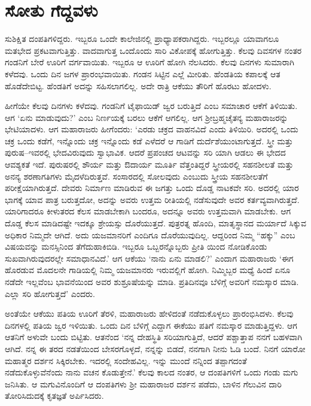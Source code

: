\section{ಸೋತು ಗೆದ್ದವಳು}

ಸುಶಿಕ್ಷಿತ ದಂಪತಿಗಳಿದ್ದರು. ಇಬ್ಬರೂ ಒಂದೇ ಕಾಲೇಜಿನಲ್ಲಿ ಪ್ರಾಧ್ಯಾಪಕರಾಗಿದ್ದರು. ಇಬ್ಬರಲ್ಲೂ ಯಾವಾಗಲೂ ಮತಭೇದ ಪ್ರಕಟವಾಗುತ್ತಿತ್ತು. ವಾದವಾಗುತ್ತ ಒಂದೊಂದು ಸಾರಿ ವಿಕೋಪಕ್ಕೆ ಹೋಗುತ್ತಿತ್ತು. ಕೆಲವು ದಿವಸಗಳ ನಂತರ ಗಂಡನಿಗೆ ಬೇರೆ ಊರಿಗೆ ವರ್ಗವಾಯಿತು. ಇಬ್ಬರೂ ಆ ಊರಿಗೆ ಹೋಗಿ ನೆಲಸಿದರು. ಕೆಲವು ದಿನಗಳು ಸುಮಾರಾಗಿ ಕಳೆದವು. ಒಂದು ದಿನ ಜಗಳ ಪ್ರಾರಂಭವಾಯಿತು. ಗಂಡನ ಸಿಟ್ಟಿನ ಎಲ್ಲೆ ಮೀರಿತು. ಹೆಂಡತಿಯ ಕಪಾಲಕ್ಕೆ ಆತ ಹೊಡೆದೇಬಿಟ್ಟ. ಹೆಂಡತಿಗೆ ಅದನ್ನು ಸಹಿಸಲಾಗಲಿಲ್ಲ. ಅದೇ ರಾತ್ರಿ ಆಕೆಯು ತೌರಿಗೆ ಹೊರಟು ಹೋದಳು.

ಹೀಗೆಯೇ ಕೆಲವು ದಿನಗಳು ಕಳೆದವು. ಗಂಡನಿಗೆ ಟೈಫಾಯಿಡ್ ಜ್ವರ ಬರುತ್ತಿದೆ ಎಂಬ ಸಮಾಚಾರ ಆಕೆಗೆ ತಿಳಿಯಿತು. ಆಗ ‘ಏನು ಮಾಡುವುದು?’ ಎಂಬ ನಿರ್ಣಯಕ್ಕೆ ಬರಲು ಆಕೆಗೆ ಆಗಲಿಲ್ಲ. ಆಗ ಶ‍್ರೀಬ್ರಹ್ಮಚೈತನ್ಯ ಮಹಾರಾಜರನ್ನು ಭೇಟಿಯಾದಳು. ಆಗ ಮಹಾರಾಜರು ಹೀಗೆಂದರು: ‘ಎರಡು ಚಕ್ರದ ವಾಹನವಿದೆ ಎಂದು ತಿಳಿಯಿರಿ. ಅದರಲ್ಲಿ ಒಂದು ಚಕ್ರ ಒಂದು ಕಡೆಗೆ, ಇನ್ನೊಂದು ಚಕ್ರ ಇನ್ನೊಂದು ಕಡೆ ಎಳೆದರೆ ಆ ಗಾಡಿಗೆ ದುರ್ದೆಶೆಯುಂಟಾಗುತ್ತದೆ. ಸ್ತ್ರೀ ಮತ್ತು ಪುರುಷ–ಇವರಲ್ಲಿ ಭೇದವಿರುವುದು ಸ್ವಾಭಾವಿಕ. ಆದರೆ ಪ್ರಪಂಚದ ಆಟವನ್ನು ಸರಿ ಯಾಗಿ ಆಡಲು ಈ ಭೇದದ ಆವಶ್ಯಕತೆ ಇದೆ. ಪುರುಷರಲ್ಲಿ ಶೌರ್ಯ ಮತ್ತು ಔದಾರ್ಯ ಮೂರ್ತಿ ವೆತ್ತಂತಿದ್ದರೆ ಸ್ತ್ರೀಯರಲ್ಲಿ ಸಹನಶೀಲತೆ ಮತ್ತು ಅನನ್ಯ ಶರಣಾಗತಿಗಳು ಮೈದಳೆದಿರುತ್ತವೆ. ಸಂಸಾರದಲ್ಲಿ ಸೋಲವುದು ಎಂಬುದು ಸ್ತ್ರೀಯ ಸಹನಶೀಲತೆಗೆ ಪರೀಕ್ಷೆಯಾಗಿರುತ್ತದೆ. ದೇವರು ನಿರ್ಮಾಣ ಮಾಡಿರುವ ಈ ಜಗತ್ತು ಒಂದು ದೊಡ್ಡ ನಾಟಕವೇ ಸರಿ. ಅದರಲ್ಲಿ ಯಾರ ಭಾಗಕ್ಕೆ ಯಾವ ಪಾತ್ರ ಬರುತ್ತದೋ, ಅದನ್ನು ಅವರು ಉತ್ತಮ ರೀತಿಯಲ್ಲಿ ನಡೆಸುವುದೇ ಅವರ ಕರ್ತವ್ಯವಾಗಿರುತ್ತದೆ. ಯಾರಿಗಾದರೂ ಕೀಳುತರದ ಕೆಲಸ ಮಾಡಬೇಕಾಗಿ ಬಂದರೂ, ಅದನ್ನೂ ಅವರು ಉತ್ತಮವಾಗಿ ಮಾಡಬೇಕು. ಆಗ ದೊಡ್ಡ ಕೆಲಸ ಮಾಡಿದಷ್ಟೇ ಇದಕ್ಕೂ ಶ್ರೇಯಸ್ಸು ದೊರೆಯುತ್ತದೆ. ಪುತ್ರರತ್ನ ಹೊಂದಿ, ಮಾತೃಸ್ಥಾನದ ಮರ್ಯಾದೆ ಸಿಕ್ಕುವ ಅಧಿಕಾರ ನಿಮ್ಮದೇ ಆಗಿದೆ. ಅದು ಯಜಮಾನರಿಗೆ ಎಂದಿಗೂ ದೊರೆಯುವುದಿಲ್ಲ. ಆದ್ದರಿಂದ ನಿಮ್ಮ “ಹಕ್ಕು” ಎಂಬ ವಿಷಯವನ್ನು ಮನಸ್ಸಿನಿಂದ ತೆಗೆದುಹಾಕಿಬಿಡಿ. ಇಬ್ಬರೂ ಒಬ್ಬರನ್ನೊಬ್ಬರು ಪ್ರೀತಿ ಯಿಂದ ನೋಡಿಕೊಂಡು ಸುಖವಾಗಿರುವುದರಲ್ಲೇ ಸಮಾಧಾನವಿದೆ.’ ಆಗ ಆಕೆಯು ‘ನಾನು ಏನು ಮಾಡಲಿ?’ ಎಂದಾಗ ಮಹಾರಾಜರು ‘ಈಗ ಹೊರಡುವ ಮೊದಲನೇ ಗಾಡಿಯಲ್ಲಿ ನಿಮ್ಮ ಯಜಮಾನರು ಇರುವಲ್ಲಿಗೆ ಹೋಗಿ. ನಿಮ್ಮಿಬ್ಬರ ಮಧ್ಯೆ ಹಿಂದೆ ಏನೂ ನಡೆದೇ ಇಲ್ಲವೆಂಬ ಭಾವನೆಯಿಂದ ಅವರ ಶುಶ್ರೂಷೆಯನ್ನು ಮಾಡಿ. ಪ್ರತಿದಿನವೂ ಬೆಳಿಗ್ಗೆ ಅವರಿಗೆ ನಮಸ್ಕಾರ ಮಾಡಿ. ಎಲ್ಲಾ ಸರಿ ಹೋಗುತ್ತದೆ’ ಎಂದರು.

ಅಂತೆಯೇ ಆಕೆಯು ಪತಿಯ ಊರಿಗೆ ತೆರಳಿ, ಮಹಾರಾಜರು ಹೇಳಿದಂತೆ ನಡೆದುಕೊಳ್ಳಲು ಪ್ರಾರಂಭಿಸಿದಳು. ಕೆಲವು ದಿನಗಳಲ್ಲಿ ಪತಿಯ ಜ್ವರ ಇಳಿಯಿತು. ಒಂದು ದಿನ ಬೆಳಿಗ್ಗೆ ಎದ್ದಾಗ ಈಕೆಯು ಪತಿಗೆ ನಮಸ್ಕಾರ ಮಾಡುತ್ತಿದ್ದಳು. ಆಗ ಆತನಿಗೆ ಅಳುವೇ ಬಂದು ಬಿಟ್ಟಿತು. ಆತನೆಂದ ‘ನನ್ನ ದೇಹಸ್ಥಿತಿ ಸರಿಯಾಗುತ್ತಿದೆ, ಆದರೆ ಪಶ್ಚಾತ್ತಾಪ ನನಗೆ ಬಹಳವಾಗಿ ಆಗಿದೆ. ನನ್ನ ಈ ತರದ ನಡತೆಯಿಂದ ಬೇಸರಗೊಳ್ಳದೆ, ನನ್ನನ್ನು ಬಿಡದೆ, ನನಗಾಗಿ ನೀನು ಓಡಿ ಬಂದೆ. ನಿನಗೆ ಯಾರೋ ಮಹಾತ್ಮರ ದರ್ಶನ ಸಿಕ್ಕಿರಬೇಕು. ಇದರಲ್ಲಿ ಸಂದೇಹವಿಲ್ಲ. ಇನ್ನು ಮುಂದೆ ನನ್ನಿಂದ ತಪ್ಪಾಗದಂತೆ ನಡೆದುಕೊಳ್ಳುವೆನೆಂದು ನಾನು ವಚನ ಕೊಡುತ್ತೇನೆ.’ ಕೆಲವು ಕಾಲದ ನಂತರ, ಆ ದಂಪತಿಗಳಿಗೆ ಒಂದು ಗಂಡು ಮಗು ಜನಿಸಿತು. ಆ ಮಗುವಿನೊಂದಿಗೆ ಆ ದಂಪತಿಗಳು ಶ‍್ರೀ ಮಹಾರಾಜರ ದರ್ಶನ ಪಡೆದು, ಬಾಳಿನ ಗೆಲುವಿನ ದಾರಿ ತೋರಿಸಿದುದಕ್ಕೆ ಕೃತಜ್ಞತೆ ಅರ್ಪಿಸಿದರು.


